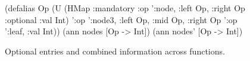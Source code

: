 \begin{figure}
\begin{cljlisting}
(defalias Op 
  (U (HMap :mandatory
           {:op ':node, :left Op, :right Op}
           :optional {:val Int})
     '{:op ':node3, :left Op, :mid Op, :right Op}
     '{:op ':leaf, :val Int}))
(ann nodes [Op -> Int])
(ann nodes' [Op -> Int])
\end{cljlisting}
\caption{Optional entries and combined information across functions.}
\label{fig:infer:node3}
\end{figure}

%


% 





%



